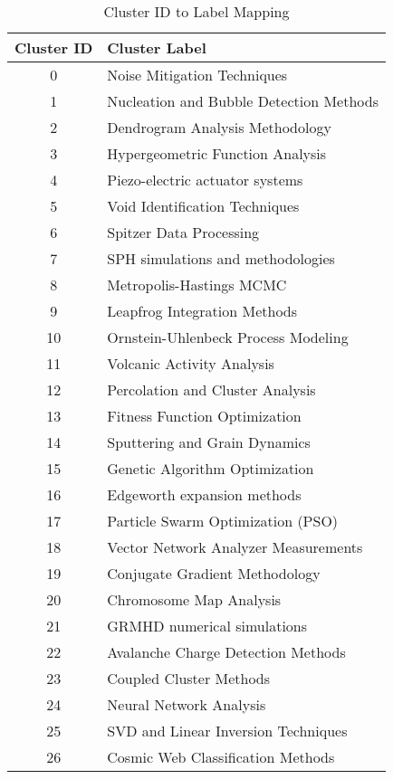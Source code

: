 \begin{table}[htbp]
\centering
\caption{Cluster ID to Label Mapping}
\label{tab:cluster_labels}
\begin{tabular}{|c|l|}
\hline
\textbf{Cluster ID} & \textbf{Cluster Label} \\
\hline
0 & Noise Mitigation Techniques \\
\hline
1 & Nucleation and Bubble Detection Methods \\
\hline
2 & Dendrogram Analysis Methodology \\
\hline
3 & Hypergeometric Function Analysis \\
\hline
4 & Piezo-electric actuator systems \\
\hline
5 & Void Identification Techniques \\
\hline
6 & Spitzer Data Processing \\
\hline
7 & SPH simulations and methodologies \\
\hline
8 & Metropolis-Hastings MCMC \\
\hline
9 & Leapfrog Integration Methods \\
\hline
10 & Ornstein-Uhlenbeck Process Modeling \\
\hline
11 & Volcanic Activity Analysis \\
\hline
12 & Percolation and Cluster Analysis \\
\hline
13 & Fitness Function Optimization \\
\hline
14 & Sputtering and Grain Dynamics \\
\hline
15 & Genetic Algorithm Optimization \\
\hline
16 & Edgeworth expansion methods \\
\hline
17 & Particle Swarm Optimization (PSO) \\
\hline
18 & Vector Network Analyzer Measurements \\
\hline
19 & Conjugate Gradient Methodology \\
\hline
20 & Chromosome Map Analysis \\
\hline
21 & GRMHD numerical simulations \\
\hline
22 & Avalanche Charge Detection Methods \\
\hline
23 & Coupled Cluster Methods \\
\hline
24 & Neural Network Analysis \\
\hline
25 & SVD and Linear Inversion Techniques \\
\hline
26 & Cosmic Web Classification Methods \\
\hline

\end{tabular}
\end{table}
